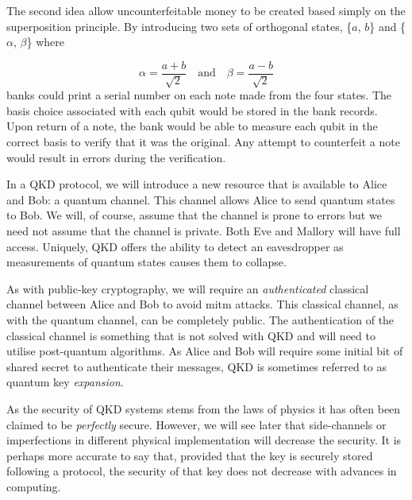 The second idea allow uncounterfeitable money to be created based simply on the superposition principle. By introducing two sets of orthogonal states, \{$a$, $b$\} and \{$\alpha$, $\beta$\} where

\begin{equation}
	\alpha = \frac{a+b}{\sqrt{2}} \quad \text{and} \quad \beta = \frac{a-b}{\sqrt{2}}
\end{equation}
banks could print a serial number on each note made from the four states. The basis choice associated with each qubit would be stored in the bank records. Upon return of a note, the bank would be able to measure each qubit in the correct basis to verify that it was the original. Any attempt to counterfeit a note would result in errors during the verification. 


In a \ac{QKD} protocol, we will introduce a new resource that is available to Alice and Bob:  a quantum channel. This channel allows Alice to send quantum states to Bob. We will, of course, assume that the channel is prone to errors but we need not assume that the channel is private. Both Eve and Mallory will have full access. Uniquely, \ac{QKD} offers the ability to detect an eavesdropper as measurements of quantum states causes them to collapse.

As with public-key cryptography, we will require an \emph{authenticated} classical channel between Alice and Bob to avoid \ac{mitm} attacks. This classical channel, as with the quantum channel, can be completely public. The authentication of the classical channel is something that is not solved with \ac{QKD} and will need to utilise post-quantum algorithms. As Alice and Bob will require some initial bit of shared secret to authenticate their messages, \ac{QKD} is sometimes referred to as quantum key \emph{expansion}. 

As the security of \ac{QKD} systems stems from the laws of physics it has often been claimed to be \emph{perfectly} secure. However, we will see later that side-channels or imperfections in different physical implementation will decrease the security. It is perhaps more accurate to say that, provided that the key is securely stored following a protocol, the security of that key does not decrease with advances in computing. 


